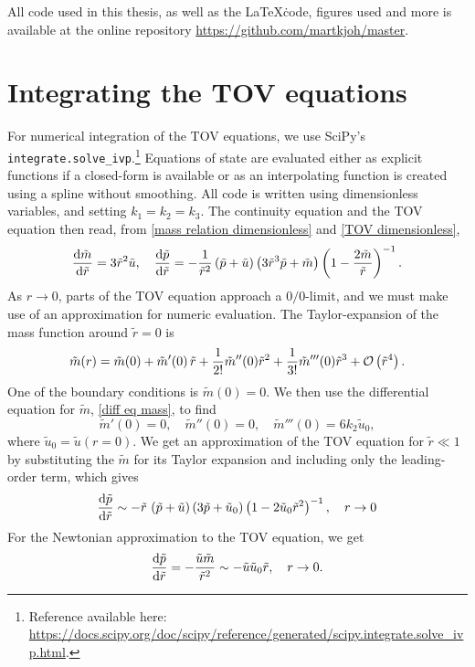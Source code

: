 \label{appendix: code} 
 
All code used in this thesis, as well as the \LaTeX\. code, figures used and more is available at the online repository \url{https://github.com/martkjoh/master}.


\section{Integrating the TOV equations}

For numerical integration of the TOV equations, we use SciPy's \texttt{integrate.solve\_ivp}.\footnote{
    Reference available here: \url{https://docs.scipy.org/doc/scipy/reference/generated/scipy.integrate.solve_ivp.html}.
    }
Equations of state are evaluated either as explicit functions if a closed-form is available or as an interpolating function is created using a spline without smoothing.
All code is written using dimensionless variables, and setting $k_1 = k_2 = k_3$.
The continuity equation and the TOV equation then read, from \autoref{mass relation dimensionless} and \autoref{TOV dimensionless},
%
\begin{align}
    \odv{\tilde m}{\tilde r} 
    = 3 \tilde r^2 \tilde u, \quad
    \odv{\tilde p}{\tilde r} 
     = - \frac{1}{\tilde r^2} \left(\tilde p + \tilde u\right) 
    \left(3  \tilde r^3 \tilde p + \tilde m\right) 
    \left(1 - \frac{2 \tilde m}{\tilde r}\right)^{-1}.
\end{align}
%
As $r \rightarrow 0$, parts of the TOV equation approach a $0/0$-limit, and we must make use of an approximation for numeric evaluation.
The Taylor-expansion of the mass function around $\tilde r = 0$ is
%
\begin{equation}
    \tilde m(r) = \tilde m(0) + \tilde m'(0) \, \tilde r + \frac{1}{2!} \tilde m''(0) \tilde r^2
    + \frac{1}{3!} \tilde m'''(0) \tilde r^3 + \mathcal O\left(\tilde r^4\right).
\end{equation}
%
One of the boundary conditions is $\tilde m(0) = 0$.
We then use the differential equation for $\tilde m$, \autoref{diff eq mass}, to find
%
\begin{equation}
    \tilde m'(0) = 0, \quad
    \tilde m''(0) = 0, \quad
    \tilde m'''(0) = 6 k_2 \tilde u_0,
\end{equation}
%
where $\tilde u_0 = \tilde u(r = 0)$.
We get an approximation of the TOV equation for $\tilde r \ll 1$ by substituting the $\tilde m$ for its Taylor expansion and including only the leading-order term, which gives
%
\begin{equation}
    \odv{\tilde p}{\tilde r}
    \sim - \tilde r \, \left(\tilde p + \tilde u\right)
    \left( 3 \tilde p + \tilde u_0  \right)
    \left(1 - 2 \tilde u_0 \tilde r^2\right)^{-1}, \quad r\rightarrow 0
\end{equation}
%
For the Newtonian approximation to the TOV equation, we get
%
\begin{equation}
    \odv{\tilde p}{\tilde r} = -\frac{\tilde u \tilde m}{\tilde r^2}
    \sim - \tilde u \tilde u_0 \tilde r,  \quad r\rightarrow 0.
\end{equation}

